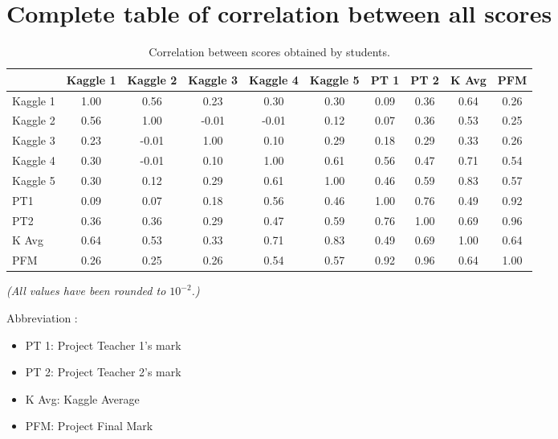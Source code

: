 \documentclass[a4paper]{article}
\begin{document}
	\section*{Complete table of correlation between all scores}
	\begin{table}[!h]
		\begin{tabular}{|l|c|c|c|c|c|c|c|c|c|}
			\hline
			{} & Kaggle 1 & Kaggle 2 & Kaggle 3 & Kaggle 4 & Kaggle 5 & PT 1 & PT 2 & K Avg & PFM \\
			\hline
			Kaggle 1 & 1.00 & 0.56  & 0.23  & 0.30  & 0.30 & 0.09 & 0.36 & 0.64 & 0.26 \\
			Kaggle 2 & 0.56 & 1.00  & -0.01 & -0.01 & 0.12 & 0.07 & 0.36 & 0.53 & 0.25 \\
			Kaggle 3 & 0.23 & -0.01 & 1.00  & 0.10  & 0.29 & 0.18 & 0.29 & 0.33 & 0.26 \\
			Kaggle 4 & 0.30 & -0.01 & 0.10  & 1.00  & 0.61 & 0.56 & 0.47 & 0.71 & 0.54 \\
			Kaggle 5 & 0.30 & 0.12  & 0.29  & 0.61  & 1.00 & 0.46 & 0.59 & 0.83 & 0.57 \\
			PT1      & 0.09 & 0.07  & 0.18  & 0.56  & 0.46 & 1.00 & 0.76 & 0.49 & 0.92 \\
			PT2      & 0.36 & 0.36  & 0.29  & 0.47  & 0.59 & 0.76 & 1.00 & 0.69 & 0.96 \\
			K Avg    & 0.64 & 0.53  & 0.33  & 0.71  & 0.83 & 0.49 & 0.69 & 1.00 & 0.64 \\
			PFM      & 0.26 & 0.25  & 0.26  & 0.54  & 0.57 & 0.92 & 0.96 & 0.64 & 1.00 \\
			\hline
		\end{tabular}
		\caption{Correlation between scores obtained by students.}
		\label{table:all_correlations}
	\end{table}
	\vspace{0.1cm}
	\textit{(All values have been rounded to $10^{-2}$.)}

	\vspace{0.5cm}
	Abbreviation :
	\begin{itemize}
		\item PT 1: Project Teacher 1's mark
		\item PT 2: Project Teacher 2's mark
		\item K Avg: Kaggle Average
		\item PFM: Project Final Mark
	\end{itemize}
	
\end{document}
